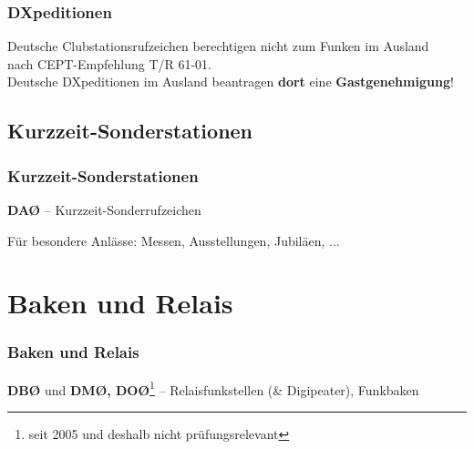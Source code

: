 \begin{frame}
    \frametitle{DXpeditionen}

    \begin{center}
      Deutsche Clubstationsrufzeichen berechtigen nicht zum Funken im
      Ausland\\
      nach CEPT-Empfehlung T/R 61-01.\\[2em]

      Deutsche DXpeditionen im Ausland
      beantragen \textbf{dort} eine \textbf{Gastgenehmigung}!
    \end{center}

\end{frame}

\subsection{Kurzzeit-Sonderstationen}

\begin{frame}
  \frametitle{Kurzzeit-Sonderstationen}

  \textbf{DAØ} -- Kurzzeit-Sonderrufzeichen

  Für besondere Anlässe: Messen, Ausstellungen, Jubiläen, ... \\[3em]



\end{frame}

\section{Baken und Relais}


\begin{frame}
  \frametitle{Baken und Relais}

  \textbf{DBØ} und \textbf{DMØ, DOØ}\footnote{seit 2005 und deshalb nicht
  prüfungsrelevant} -- Relaisfunkstellen (\& Digipeater), Funkbaken \\[1em]


\end{frame}

